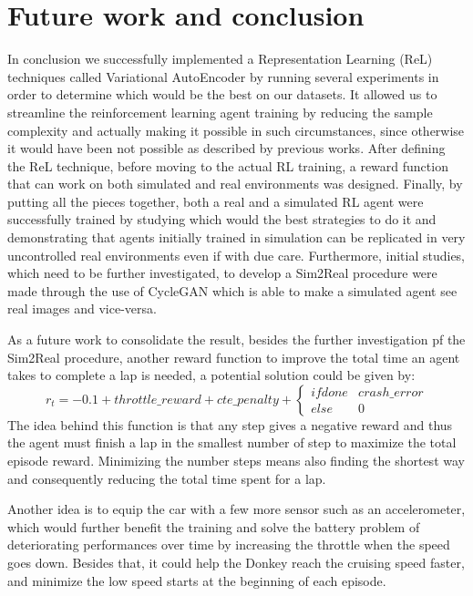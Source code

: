 \chapter{Future work and conclusion}

In conclusion we successfully implemented a Representation Learning (ReL) techniques called Variational AutoEncoder by running several experiments in order to determine which would be the best on our datasets. It allowed us to streamline the reinforcement learning agent training by reducing the sample complexity and actually making it possible in such circumstances, since otherwise it would have been not possible as described by previous works. After defining the ReL technique, before moving to the actual RL training, a reward function that can work on both simulated and real environments was designed. Finally, by putting all the pieces together, both a real and a simulated RL agent were successfully trained by studying which would the best strategies to do it and demonstrating that agents initially trained in simulation can be replicated in very uncontrolled real environments even if with due care. Furthermore, initial studies, which need to be further investigated, to develop a Sim2Real procedure were made through the use of CycleGAN which is able to make a simulated agent see real images and vice-versa. 

As a future work to consolidate the result, besides the further investigation pf the Sim2Real procedure, another reward function to improve the total time an agent takes to complete a lap is needed, a potential solution could be given by:
\begin{equation}
  \label{eq:testreward}
  r_t = - 0.1 + throttle\_reward + cte\_penalty + \left\{\begin{matrix}
    if done & crash\_error \\ 
    else & 0  
    \end{matrix}\right.
\end{equation}
The idea behind this function is that any step gives a negative reward and thus the agent must finish a lap in the smallest number of step to maximize the total episode reward. Minimizing the number steps means also finding the shortest way and consequently reducing the total time spent for a lap. 

Another idea is to equip the car with a few more sensor such as an accelerometer, which would further benefit the training and solve the battery problem of deteriorating performances over time by increasing the throttle when the speed goes down. Besides that, it could help the Donkey reach the cruising speed faster, and minimize the low speed starts at the beginning of each episode.